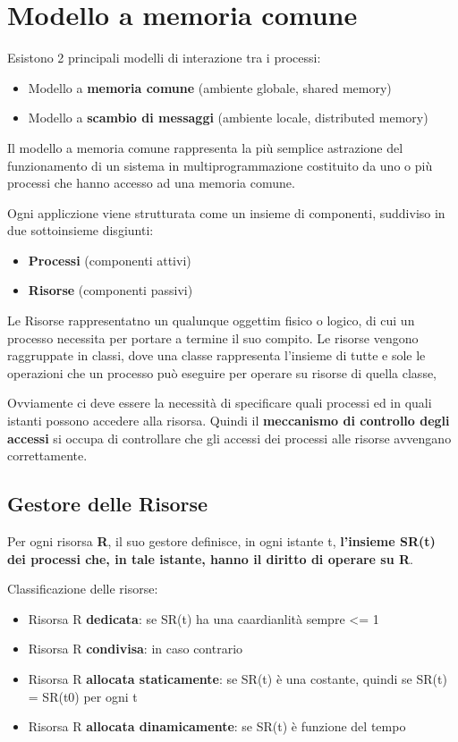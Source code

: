 \documentclass{article}
\begin{document}
\section{Modello a memoria comune}

Esistono 2 principali modelli di interazione tra i processi:
\begin{itemize}
    \item Modello a \textbf{memoria comune} (ambiente globale, shared memory)
    \item Modello a \textbf{scambio di messaggi} (ambiente locale, distributed memory)
\end{itemize}

Il modello a memoria comune rappresenta la più semplice astrazione del funzionamento di un sistema in multiprogrammazione costituito da uno o più processi che hanno accesso
ad una memoria comune.

Ogni appliczione viene strutturata come un insieme di componenti, suddiviso in due sottoinsieme disgiunti:
\begin{itemize}
    \item \textbf{Processi} (componenti attivi)
    \item \textbf{Risorse} (componenti passivi)
\end{itemize}

Le Risorse rappresentatno un qualunque oggettim fisico o logico, di cui un processo necessita per portare a termine il suo compito.
Le risorse vengono raggruppate in classi, dove una classe rappresenta l'insieme di tutte e sole le operazioni che un processo può eseguire per operare su risorse di quella classe,

Ovviamente ci deve essere la necessità di specificare quali processi ed in quali istanti possono accedere alla risorsa. Quindi il \textbf{meccanismo di controllo degli accessi}
si occupa di controllare che gli accessi dei processi alle risorse avvengano correttamente.

\subsection{Gestore delle Risorse}

Per ogni risorsa \textbf{R}, il suo gestore definisce, in ogni istante t, \textbf{l'insieme SR(t) dei processi che, in tale istante, hanno il diritto di operare su R}.

\vspace{5mm}

Classificazione delle risorse:
\begin{itemize}
    \item Risorsa R \textbf{dedicata}: se SR(t) ha una caardianlità sempre <= 1
    \item Risorsa R \textbf{condivisa}: in caso contrario
    \item Risorsa R \textbf{allocata staticamente}: se SR(t) è una costante, quindi se SR(t) = SR(t0) per ogni t
    \item Risorsa R \textbf{allocata dinamicamente}: se SR(t) è funzione del tempo
\end{itemize}
\end{document}
